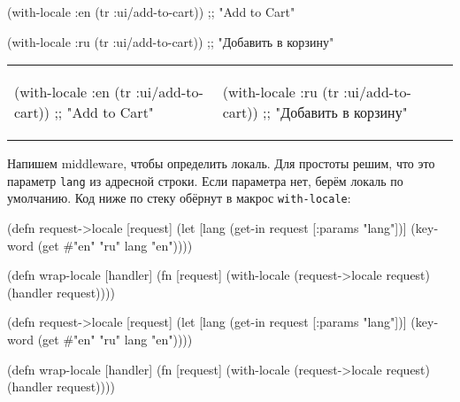 \ifx\DEVICETYPE\MOBILE

\begin{clojure}
(with-locale :en
  (tr :ui/add-to-cart))
;; "Add to Cart"
\end{clojure}

\splitter

\begin{clojure}
(with-locale :ru
  (tr :ui/add-to-cart))
;; "Добавить в корзину"
\end{clojure}

\else


\noindent
\begin{tabular}{ @{}p{5cm} @{}p{5cm} }

  \begin{clojure}
(with-locale :en
  (tr :ui/add-to-cart))
;; "Add to Cart"
  \end{clojure}

&

  \begin{clojure}
(with-locale :ru
  (tr :ui/add-to-cart))
;; "Добавить в корзину"
  \end{clojure}

\end{tabular}


\fi

Напишем middleware, чтобы определить локаль. Для простоты решим, что это
параметр \verb|lang| из адресной строки. Если параметра нет, берём локаль по
умолчанию. Код ниже по стеку обёрнут в макрос \verb|with-locale|:

\ifx\DEVICETYPE\MOBILE

\begin{english}
  \begin{clojure}
(defn request->locale [request]
  (let [lang (get-in request
               [:params "lang"])]
    (keyword
      (get #{"en" "ru"} lang "en"))))

(defn wrap-locale [handler]
  (fn [request]
    (with-locale
      (request->locale request)
      (handler request))))
  \end{clojure}
\end{english}

\else

\begin{english}
  \begin{clojure}
(defn request->locale [request]
  (let [lang (get-in request [:params "lang"])]
    (keyword (get #{"en" "ru"} lang "en"))))

(defn wrap-locale [handler]
  (fn [request]
    (with-locale (request->locale request)
      (handler request))))
  \end{clojure}
\end{english}

